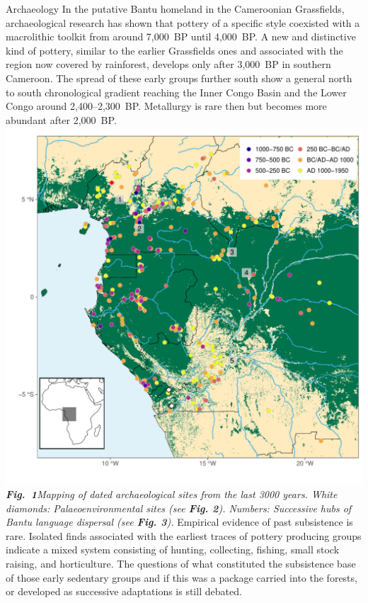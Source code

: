 \documentclass[a0]{sciposter}
\begin{document}
{\begin{minipage}[t][102cm][t]{82cm}
\begin{minipage}[t]{77cm}
\begin{multicols}{3}
{\fontsize{38}{42} \selectfont \textcolor{HeadCol}{Archaeology}}
\bigbreak
{\fontsize{28}{36} \selectfont In the putative Bantu homeland in the Cameroonian Grassfields, archaeological research has shown that pottery of a specific style coexisted with a macrolithic toolkit from around 7,000~BP until 4,000~BP. A new and distinctive kind of pottery, similar to the earlier Grassfields ones and associated with the region now covered by rainforest, develops only after 3,000~BP in southern Cameroon. The spread of these early groups further south show a general north to south chronological gradient reaching the Inner Congo Basin and the Lower Congo around 2,400--2,300~BP. Metallurgy is rare then but becomes more abundant after 2,000~BP.}
\includegraphics[width = \linewidth]{img/FigArch-A_map.pdf}
{\fontsize{22}{0} \selectfont \textit{\textbf{Fig.~1}\hspace{1em}Mapping of dated archaeological sites from the last 3000 years. White diamonds: Palaeoenvironmental sites (see \textbf{Fig. 2}). Numbers: Successive hubs of Bantu language dispersal (see \textbf{Fig. 3}).}}
\bigbreak
{\fontsize{28}{36} \selectfont Empirical evidence of past subsistence is rare. Isolated finds associated with the earliest traces of pottery producing groups indicate a mixed system consisting of hunting, collecting, fishing, small stock raising, and horticulture. The questions of what constituted the subsistence base of those early sedentary groups and if this was a package carried into the forests, or developed as successive adaptations is still debated.}

\end{multicols}
\end{minipage}
\end{minipage}}
\end{document}

